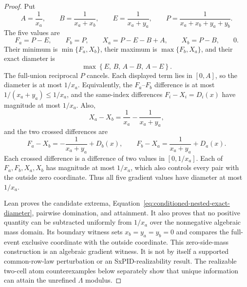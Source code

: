 \documentclass[11pt]{article}
\theoremstyle{definition}
\begin{document}
\begin{proof}
Put
\begin{equation}
  A=\frac1{x_a},
  \qquad
  B=\frac1{x_a+x_b},
  \qquad
  E=\frac1{x_a+y_a},
  \qquad
  P=\frac1{x_a+x_b+y_a+y_b}.
\end{equation}
The five values are
\begin{equation}
  F_a=P-E,
  \qquad
  F_b=P,
  \qquad
  X_a=P-E-B+A,
  \qquad
  X_b=P-B,
  \qquad
  0.
\end{equation}
Their minimum is $\min\{F_a,X_b\}$, their maximum is $\max\{F_b,X_a\}$, and their exact
diameter is
\begin{equation}\label{eq:conditioned-nested-exact-diameter}
  \max\left\{
    E,\,
    B,\,
    A-B,\,
    A-E
  \right\}.
\end{equation}
The full-union reciprocal $P$ cancels.  Each displayed term lies in $[0,A]$, so the diameter is
at most $1/x_a$.  Equivalently, the $F_a$--$F_b$ difference is at most
$1/(x_a+y_a)\le1/x_a$, and the same-index differences
$F_i-X_i=D_i(x)$ have magnitude at most $1/x_a$.  Also,
\begin{equation}
  X_a-X_b=\frac1{x_a}-\frac1{x_a+y_a},
\end{equation}
and the two crossed differences are
\begin{equation}
  F_a-X_b=-\frac1{x_a+y_a}+D_b(x),
  \qquad
  F_b-X_a=\frac1{x_a+y_a}+D_a(x).
\end{equation}
Each crossed difference is a difference of two values in $[0,1/x_a]$.  Each of
$F_a,F_b,X_a,X_b$ has magnitude at most $1/x_a$, which also controls every pair with the outside
zero coordinate.  Thus all five gradient values have diameter at most $1/x_a$.

Lean proves the candidate extrema, Equation~\eqref{eq:conditioned-nested-exact-diameter}, pairwise
domination, and attainment.  It also proves that no positive quantity can be subtracted uniformly
from $1/x_a$ over the nonnegative algebraic mass domain.  Its boundary witness sets
$x_b=y_a=y_b=0$ and compares the full-event exclusive coordinate with the outside coordinate.
This zero-side-mass construction is an algebraic gradient witness.  It is not by itself a
supported common-row-law perturbation or an SxPID-realizability result.  The realizable two-cell atom
counterexamples below separately show that unique information can attain the unrefined
$\Lambda$ modulus.


\end{proof}
\end{document}
